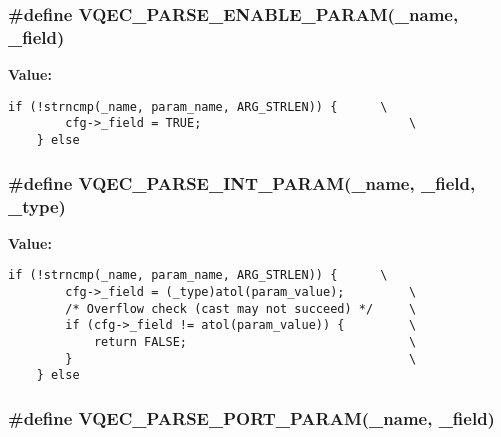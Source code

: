 \subsubsection{\setlength{\rightskip}{0pt plus 5cm}\#define VQEC\_\-PARSE\_\-ENABLE\_\-PARAM(\_\-name, \_\-field)}\label{vqec__cli__register_8c_b164951881635f913d165ac15c79523a}


\textbf{Value:}

\begin{Code}\begin{verbatim}if (!strncmp(_name, param_name, ARG_STRLEN)) {      \
        cfg->_field = TRUE;                             \
    } else
\end{verbatim}\end{Code}
\subsubsection{\setlength{\rightskip}{0pt plus 5cm}\#define VQEC\_\-PARSE\_\-INT\_\-PARAM(\_\-name, \_\-field, \_\-type)}\label{vqec__cli__register_8c_9862c7c2dc0cb17d9de59fb9a01f6d49}


\textbf{Value:}

\begin{Code}\begin{verbatim}if (!strncmp(_name, param_name, ARG_STRLEN)) {      \
        cfg->_field = (_type)atol(param_value);         \
        /* Overflow check (cast may not succeed) */     \
        if (cfg->_field != atol(param_value)) {         \
            return FALSE;                               \
        }                                               \
    } else
\end{verbatim}\end{Code}
\subsubsection{\setlength{\rightskip}{0pt plus 5cm}\#define VQEC\_\-PARSE\_\-PORT\_\-PARAM(\_\-name, \_\-field)}\label{vqec__cli__register_8c_4dc4d88f7bc7cf2f1c88a93456dcbbb8}


